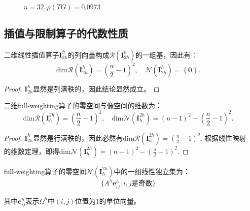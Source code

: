 \documentclass[lang=cn,10pt]{elegantbook}
\begin{document}
\begin{figure}[H]
\begin{minipage}[t]{0.24\linewidth}
    \caption*{$n=32,\rho(TG)=0.0973$}
  \end{minipage}
\end{figure}

\subsection{插值与限制算子的代数性质}

\begin{lemma}
  二维线性插值算子$\mathbf{I}^h_{2h}$的列向量构成$\mathcal{R}(\mathbf{I}^h_{2h})$的一组基，因此有：
  \begin{equation}
    \text{dim} \mathcal{R}(\mathbf{I}^h_{2h}) = \left(\frac{n}{2}-1\right)^2,\quad \mathcal{N}(\mathbf{I}^h_{2h})=\left\{\mathbf{0}\right\}.
  \end{equation}
\end{lemma}

\begin{proof}
  $\mathbf{I}^h_{2h}$显然是列满秩的，因此结论显然成立。
\end{proof}

\begin{lemma}
  二维full-weighting算子的零空间与像空间的维数为：
  \begin{equation}
    \text{dim} \mathcal{R}(\mathbf{I}^{2h}_{h}) = \left(\frac{n}{2}-1\right)^2,\quad \text{dim} \mathcal{N}(\mathbf{I}^{2h}_{h})=(n-1)^2-\left(\frac{n}{2}-1\right)^2.
  \end{equation}
\end{lemma}

\begin{proof}
  $\mathbf{I}^h_{2h}$显然是行满秩的，因此必然有$\text{dim} \mathcal{R}(\mathbf{I}^{2h}_{h}) = \left(\frac{n}{2}-1\right)^2$. 根据线性映射的维数定理，即得$\text{dim} \mathcal{N}(\mathbf{I}^{2h}_{h})=(n-1)^2-\left(\frac{n}{2}-1\right)^2$.
\end{proof}

\begin{lemma}
  full-weighting算子的零空间$\mathcal{N}(\mathbf{I}^{2h}_{h})$中的一组线性独立集为：
  \begin{equation}
    \{A^h\mathbf{e}^h_{ij}:i,j\text{是奇数}\}
  \end{equation}

  其中$\mathbf{e}^h_{ij}$表示$\Omega^h$中$(i,j)$位置为$1$的单位向量。
\end{lemma}
\end{document}
